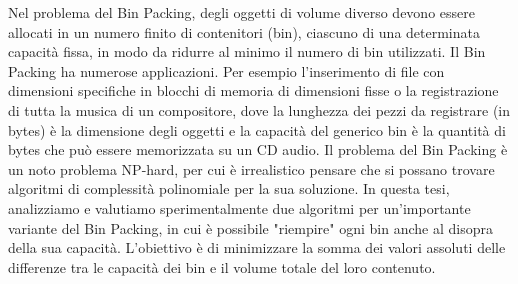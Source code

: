 Nel problema del Bin Packing, degli oggetti di volume diverso devono essere allocati in un numero finito di contenitori 
(bin), ciascuno di una determinata capacità fissa, in modo da ridurre al minimo il numero di bin utilizzati. Il Bin Packing 
ha numerose applicazioni. Per esempio l'inserimento di file con dimensioni specifiche in blocchi di memoria di dimensioni fisse 
o la registrazione di tutta la musica di un compositore, dove la lunghezza dei pezzi da registrare (in bytes) è la dimensione 
degli oggetti e la capacità del generico bin è la quantità di bytes che può essere memorizzata su un CD audio. Il problema del 
Bin Packing è un noto problema NP-hard, per cui è irrealistico pensare che si possano trovare algoritmi di complessità polinomiale 
per la sua soluzione. In questa tesi, analizziamo e valutiamo sperimentalmente due algoritmi per un'importante variante del Bin 
Packing, in cui è possibile "riempire" ogni bin anche al disopra della sua capacità. L'obiettivo è di minimizzare la somma dei 
valori assoluti delle differenze tra le capacità dei bin e il volume totale del loro contenuto.